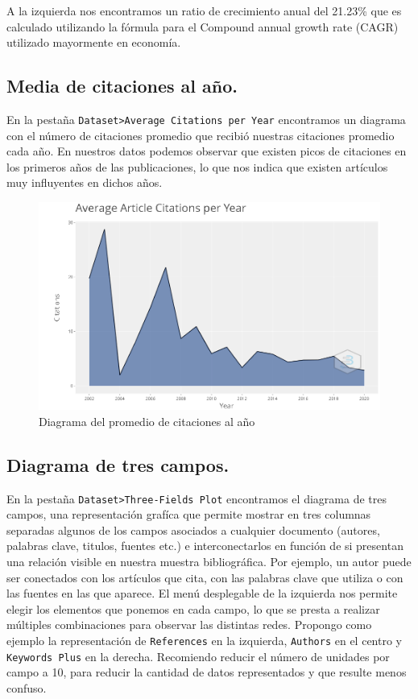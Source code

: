 \documentclass[
]{article}
\begin{document}
A la izquierda nos encontramos un ratio de crecimiento anual del 21.23\%
que es calculado utilizando la fórmula para el Compound annual growth
rate (CAGR) utilizado mayormente en economía.

\hypertarget{media-de-citaciones-al-auxf1o.}{%
\subsection{Media de citaciones al
año.}\label{media-de-citaciones-al-auxf1o.}}

En la pestaña
\texttt{Dataset\textgreater{}Average\ Citations\ per\ Year} encontramos
un diagrama con el número de citaciones promedio que recibió nuestras
citaciones promedio cada año. En nuestros datos podemos observar que
existen picos de citaciones en los primeros años de las publicaciones,
lo que nos indica que existen artículos muy influyentes en dichos años.

\begin{figure}
\centering
\includegraphics{AverageCitationsPerYear.png}
\caption{Diagrama del promedio de citaciones al año}
\end{figure}

\hypertarget{diagrama-de-tres-campos.}{%
\subsection{Diagrama de tres campos.}\label{diagrama-de-tres-campos.}}

En la pestaña \texttt{Dataset\textgreater{}Three-Fields\ Plot}
encontramos el diagrama de tres campos, una representación grafíca que
permite mostrar en tres columnas separadas algunos de los campos
asociados a cualquier documento (autores, palabras clave, titulos,
fuentes etc.) e interconectarlos en función de si presentan una relación
visible en nuestra muestra bibliográfica. Por ejemplo, un autor puede
ser conectados con los artículos que cita, con las palabras clave que
utiliza o con las fuentes en las que aparece. El menú desplegable de la
izquierda nos permite elegir los elementos que ponemos en cada campo, lo
que se presta a realizar múltiples combinaciones para observar las
distintas redes. Propongo como ejemplo la representación de
\texttt{References} en la izquierda, \texttt{Authors} en el centro y
\texttt{Keywords\ Plus} en la derecha. Recomiendo reducir el número de
unidades por campo a 10, para reducir la cantidad de datos representados
y que resulte menos confuso.
\end{document}
